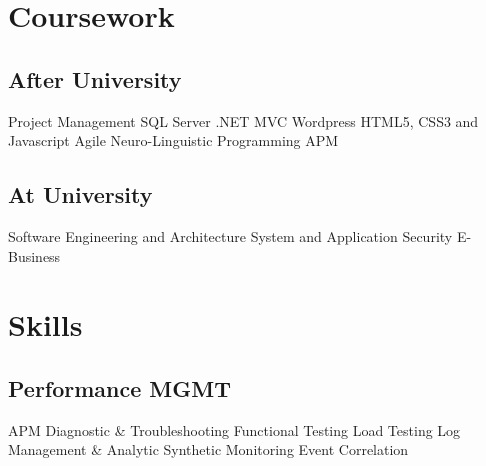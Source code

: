 \documentclass[letterpaper]{deedy-resume} %
\begin{document}
\begin{minipage}[t]{0.33\textwidth}

\section{Coursework}

\subsection{After University}

Project Management \textbullet{} 
SQL Server \textbullet{} 
.NET MVC \textbullet{} 
Wordpress \textbullet{} 
HTML5, CSS3 and Javascript \textbullet{} 
Agile \textbullet{} 
Neuro-Linguistic Programming \textbullet{}
APM

\sectionspace %


\subsection{At University}

Software Engineering and Architecture \textbullet{} 
System and Application Security \textbullet{} 
E-Business

\sectionspace %


\section{Skills}

\subsection{Performance MGMT}

%
%

APM \textbullet{}
Diagnostic \& Troubleshooting \textbullet{}
Functional Testing \textbullet{}
Load Testing \textbullet{}
Log Management \& Analytic \textbullet{}
Synthetic Monitoring \textbullet{}
Event Correlation


\end{minipage}
\end{document}
